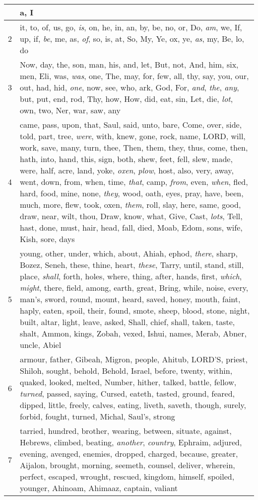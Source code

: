 \begin{longtable}{l|p{3.75in}}
\hline \hline
\endlastfoot
1 & a, I \\ \hline
2 & it, to, of, us, go, \emph{is}, on, he, in, an, by, be, no, or, Do, \emph{am}, we, If, up, if, \emph{be}, me, as, \emph{of}, so, is, at, So, My, Ye, ox, ye, \emph{as}, my, Be, lo, do \\ \hline
3 & Now, day, the, son, man, his, and, let, But, not, And, him, six, men, Eli, was, \emph{was}, one, The, may, for, few, all, thy, say, you, our, out, had, hid, \emph{one}, now, see, who, ark, God, For, \emph{and}, \emph{the}, \emph{any}, but, put, end, rod, Thy, how, How, did, eat, sin, Let, die, \emph{lot}, own, two, Ner, war, saw, any \\ \hline
4 & came, pass, upon, that, Saul, said, unto, bare, Come, over, side, told, part, tree, \emph{were}, with, knew, gone, rock, name, LORD, will, work, save, many, turn, thee, Then, them, they, thus, come, then, hath, into, hand, this, sign, both, shew, feet, fell, slew, made, were, half, acre, land, yoke, \emph{oxen}, \emph{plow}, host, also, very, away, went, down, from, when, time, \emph{that}, camp, \emph{from}, even, \emph{when}, fled, hard, food, mine, none, \emph{they}, wood, oath, eyes, pray, have, been, much, more, flew, took, oxen, \emph{them}, roll, slay, here, same, good, draw, near, wilt, thou, Draw, know, what, Give, Cast, \emph{lots}, Tell, hast, done, must, hair, head, fall, died, Moab, Edom, sons, wife, Kish, sore, days \\ \hline
5 & young, other, under, which, about, Ahiah, ephod, \emph{there}, sharp, Bozez, Seneh, these, thine, heart, \emph{these}, Tarry, until, stand, still, place, \emph{shall}, forth, holes, where, thing, after, hands, first, \emph{which}, \emph{might}, there, field, among, earth, great, Bring, while, noise, every, man's, sword, round, mount, heard, saved, honey, mouth, faint, haply, eaten, spoil, their, found, smote, sheep, blood, stone, night, built, altar, light, leave, asked, Shall, chief, shall, taken, taste, shalt, Ammon, kings, Zobah, vexed, Ishui, names, Merab, Abner, uncle, Abiel \\ \hline
6 & armour, father, Gibeah, Migron, people, Ahitub, LORD'S, priest, Shiloh, sought, behold, Behold, Israel, before, twenty, within, quaked, looked, melted, Number, hither, talked, battle, fellow, \emph{turned}, passed, saying, Cursed, eateth, tasted, ground, feared, dipped, little, freely, calves, eating, liveth, saveth, though, surely, forbid, fought, turned, Michal, Saul's, strong \\ \hline
7 & tarried, hundred, brother, wearing, between, situate, against, Hebrews, climbed, beating, \emph{another}, \emph{country}, Ephraim, adjured, evening, avenged, enemies, dropped, charged, because, greater, Aijalon, brought, morning, seemeth, counsel, deliver, wherein, perfect, escaped, wrought, rescued, kingdom, himself, spoiled, younger, Ahinoam, Ahimaaz, captain, valiant \\ \hline

\end{longtable}
